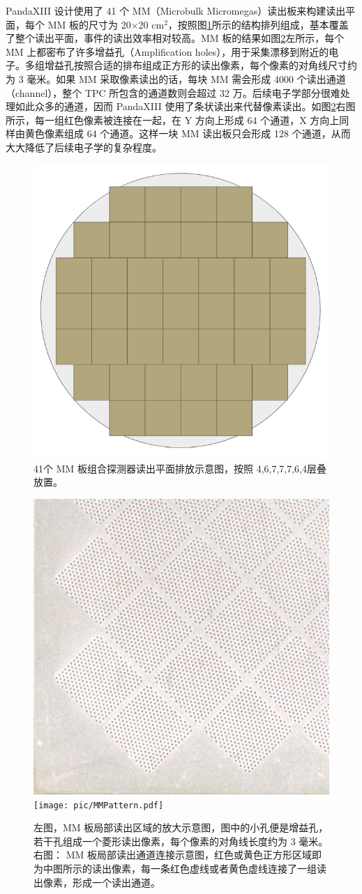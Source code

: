 PandaXIII 设计使用了 41 个 MM（Microbulk Micromegas）读出板来构建读出平面，每个 MM 板的尺寸为 20$\times$20 cm$^2$，按照图\ref{fig:mms}所示的结构排列组成，基本覆盖了整个读出平面，事件的读出效率相对较高。MM 板的结果如图\ref{fig:mm_detail}左所示，每个 MM 上都密布了许多增益孔（Amplification holes），用于采集漂移到附近的电子。多组增益孔按照合适的排布组成正方形的读出像素，每个像素的对角线尺寸约为 3 毫米。如果 MM 采取像素读出的话，每块 MM 需会形成 4000 个读出通道（channel），整个 TPC 所包含的通道数则会超过 32 万。后续电子学部分很难处理如此众多的通道，因而 PandaXIII 使用了条状读出来代替像素读出。如图\ref{fig:mm_detail}右图所示，每一组红色像素被连接在一起，在 Y 方向上形成 64 个通道，X 方向上同样由黄色像素组成 64 个通道。这样一块 MM 读出板只会形成 128 个通道，从而大大降低了后续电子学的复杂程度。

\begin{figure}[hbt]
    \centering
    \includegraphics[width=0.4\columnwidth]{pic/fig8.png}
    \caption{41个 MM 板组合探测器读出平面排放示意图，按照 4,6,7,7,7,6,4层叠放置。}
    \label{fig:mms}
\end{figure}

\begin{figure}
    \centering
    \includegraphics[width=0.4\columnwidth]{pic/MMStrips.jpg}
    \texttt{[image: pic/MMPattern.pdf]}
    \caption{左图，MM 板局部读出区域的放大示意图，图中的小孔便是增益孔，若干孔组成一个菱形读出像素，每个像素的对角线长度约为 3 毫米。右图： MM 板局部读出通道连接示意图，红色或黄色正方形区域即为中图所示的读出像素，每一条红色虚线或者黄色虚线连接了一组读出像素，形成一个读出通道。\supercite{lin2018design}}
    \label{fig:mm_detail}
\end{figure}

